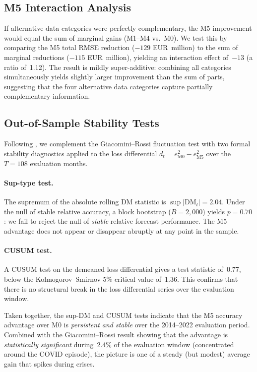 \subsection{M5 Interaction Analysis}

If alternative data categories were perfectly complementary, the M5 improvement would equal the sum of marginal gains (M1--M4 vs.~M0).  We test this by comparing the M5 total RMSE reduction ($-129$ EUR~million) to the sum of marginal reductions ($-115$ EUR~million), yielding an interaction effect of~$-13$ (a ratio of~1.12).  The result is mildly super-additive: combining all categories simultaneously yields slightly larger improvement than the sum of parts, suggesting that the four alternative data categories capture partially complementary information.

\subsection{Out-of-Sample Stability Tests}

Following \citet{rossi2013advances}, we complement the Giacomini--Rossi fluctuation test with two formal stability diagnostics applied to the loss differential $d_t = e^2_{\text{M0}} - e^2_{\text{M5}}$ over the $T = 108$ evaluation months.

\paragraph{Sup-type test.}
The supremum of the absolute rolling DM statistic is $\sup|\text{DM}_t| = 2.04$.  Under the null of stable relative accuracy, a block bootstrap ($B = 2{,}000$) yields $p = 0.70$: we fail to reject the null of \emph{stable} relative forecast performance.  The M5 advantage does not appear or disappear abruptly at any point in the sample.

\paragraph{CUSUM test.}
A CUSUM test on the demeaned loss differential gives a test statistic of~0.77, below the Kolmogorov--Smirnov 5\% critical value of~1.36.  This confirms that there is no structural break in the loss differential series over the evaluation window.

Taken together, the sup-DM and CUSUM tests indicate that the M5 accuracy advantage over M0 is \emph{persistent and stable} over the 2014--2022 evaluation period.  Combined with the Giacomini--Rossi result showing that the advantage is \emph{statistically significant} during~2.4\% of the evaluation window (concentrated around the COVID episode), the picture is one of a steady (but modest) average gain that spikes during crises.

